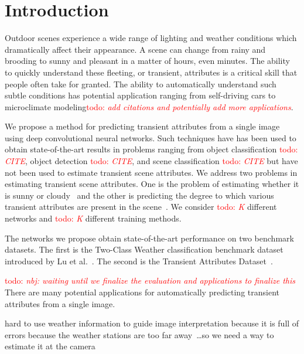 \documentclass{article}
\newcommand{\todo}[1]{\textcolor{red}{todo: {\em #1}}}
\begin{document}
\section{Introduction}


Outdoor scenes experience a wide range of lighting and weather
conditions which dramatically affect their appearance. A scene can
change from rainy and brooding to sunny and pleasant in a matter of
hours, even minutes. The ability to quickly understand these fleeting,
or transient, attributes is a critical skill that people often take
for granted. The ability to automatically understand such subtle
conditions has potential application ranging from self-driving cars to
microclimate modeling\todo{add citations and potentially add more
applications}.


We propose a method for predicting transient attributes from a single
image using deep convolutional neural networks. Such techniques have
has been used to obtain state-of-the-art results in problems ranging
from object classification \todo{CITE}, object detection \todo{CITE},
and scene classification \todo{CITE} but have not been used to
estimate transient scene attributes. We address two problems in
estimating transient scene attributes. One is the problem of
estimating whether it is sunny or cloudy~\cite{lutwoclass} and the
other is predicting the degree to which various transient attributes
are present in the scene~\cite{Laffont14}. We consider \todo{K}
different networks and \todo{K} different training methods.


The networks we propose obtain state-of-the-art performance on two
benchmark datasets. The first is the Two-Class Weather classification
benchmark dataset introduced by Lu et al.~\cite{lutwoclass}. The
second is the Transient Attributes Dataset~\cite{Laffont14}. 


\todo{nbj: waiting until we finalize the evaluation and applications
to finalize this} There are many potential applications for
automatically predicting transient attributes from a single image. 

hard to use weather information to guide image
interpretation because it is full of errors because the weather
stations are too far away~\cite{islam13webcamweather}\dots so we need
a way to estimate it at the camera
\end{document}
